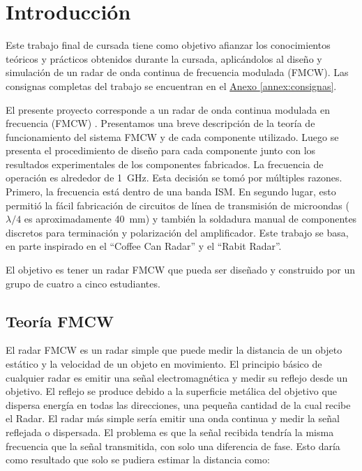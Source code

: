 \chapter{Introducción}
\label{chap:introduccion}

Este trabajo final de cursada tiene como objetivo afianzar los conocimientos teóricos y prácticos obtenidos durante la cursada, aplicándolos al diseño y simulación de un radar de onda continua de frecuencia modulada (FMCW). Las consignas completas del trabajo se encuentran en el \hyperref[annex:consignas]{Anexo \ref*{annex:consignas}}.

El presente proyecto corresponde a un radar de onda continua modulada en frecuencia (FMCW) \cite{AlmelaFMCWRadar}. 
Presentamos una breve descripción de la teoría de funcionamiento del sistema FMCW y de cada componente utilizado. 
Luego se presenta el procedimiento de diseño para cada componente junto con los resultados experimentales de los componentes fabricados. 
La frecuencia de operación es alrededor de \qty{1}{\GHz}. 
Esta decisión se tomó por múltiples razones. 
Primero, la frecuencia está dentro de una banda ISM. 
En segundo lugar, esto permitió la fácil fabricación de circuitos de línea de transmisión de microondas ($\lambda/4$ es aproximadamente \qty{40}{\mm}) y también la soldadura manual de componentes discretos para terminación y polarización del amplificador. 
Este trabajo se basa, en parte inspirado en el ``Coffee Can Radar'' y el ``Rabit Radar''.

El objetivo es tener un radar FMCW que pueda ser diseñado y construido por un grupo de cuatro a cinco estudiantes.

\section{Teoría FMCW}

El radar FMCW es un radar simple que puede medir la distancia de un objeto estático y la velocidad de un objeto en movimiento. El principio básico de cualquier radar es emitir una señal electromagnética y medir su reflejo desde un objetivo. 
El reflejo se produce debido a la superficie metálica del objetivo que dispersa energía en todas las direcciones, una pequeña cantidad de la cual recibe el Radar. 
El radar más simple sería emitir una onda continua y medir la señal reflejada o dispersada. 
El problema es que la señal recibida tendría la misma frecuencia que la señal transmitida, con solo una diferencia de fase. Esto daría como resultado que solo se pudiera estimar la distancia como:

